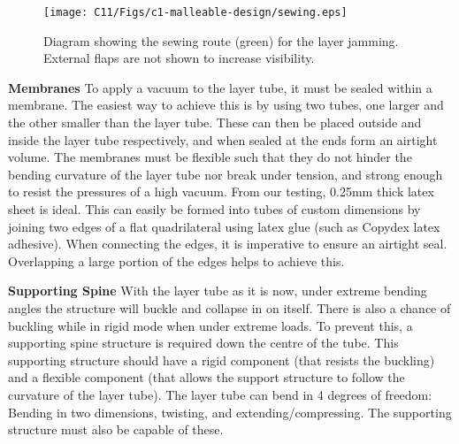 \begin{figure}[t!]
    \centering
    \texttt{[image: C11/Figs/c1-malleable-design/sewing.eps]}
    \caption{Diagram showing the sewing route (green) for the layer jamming. External flaps are not shown to increase visibility.}
    \label{sewing}
\end{figure}

\textbf{Membranes}
To apply a vacuum to the layer tube, it must be sealed within a membrane. The easiest way to achieve this is by using two tubes, one larger and the other smaller than the layer tube. These can then be placed outside and inside the layer tube respectively, and when sealed at the ends form an airtight volume. The membranes must be flexible such that they do not hinder the bending curvature of the layer tube nor break under tension, and strong enough to resist the pressures of a high vacuum. From our testing, 0.25mm thick latex sheet is ideal. This can easily be formed into tubes of custom dimensions by joining two edges of a flat quadrilateral using latex glue (such as Copydex latex adhesive). When connecting the edges, it is imperative to ensure an airtight seal. Overlapping a large portion of the edges helps to achieve this.

\textbf{Supporting Spine}
With the layer tube as it is now, under extreme bending angles the structure will buckle and collapse in on itself. There is also a chance of buckling while in rigid mode when under extreme loads. To prevent this, a supporting spine structure is required down the centre of the tube. This supporting structure should have a rigid component (that resists the buckling) and a flexible component (that allows the support structure to follow the curvature of the layer tube). The layer tube can bend in 4 degrees of freedom: Bending in two dimensions, twisting, and extending/compressing. The supporting structure must also be capable of these.

